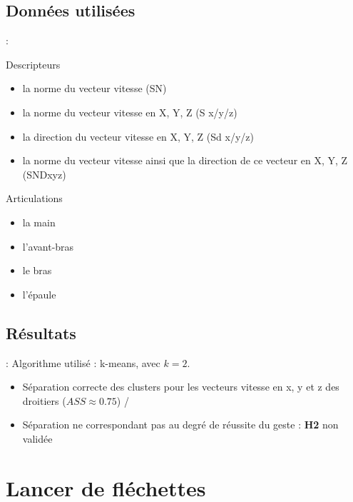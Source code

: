 \documentclass[svgnames]{beamer}
\begin{document}
	\subsection{Données utilisées}	
	\begin{frame}{\secname : \subsecname}
		\begin{block}{Descripteurs}
			\begin{itemize}
				\item la norme du vecteur vitesse (SN)
				\item la norme du vecteur vitesse en X, Y, Z (S x/y/z)
				\item la direction du vecteur vitesse en X, Y, Z (Sd x/y/z)
				\item la norme du vecteur vitesse ainsi que la direction de ce vecteur en X, Y, Z (SNDxyz)
			\end{itemize}
		\end{block}
		
		\begin{block}{Articulations}
			\begin{itemize}
				\item la main
				\item l'avant-bras
				\item le bras
				\item l'épaule
			\end{itemize}
		\end{block}
	\end{frame}
	
	\subsection{Résultats}
	\begin{frame}{\secname : \subsecname}
	Algorithme utilisé : k-means, avec $k=2$.
	\begin{itemize}
		\item Séparation correcte des clusters pour les vecteurs vitesse en x, y et z des droitiers ($ASS \approx 0.75$) /
		\item Séparation ne correspondant pas au degré de réussite du geste : \textbf{H2} non validée
	\end{itemize}
		
	\end{frame}

	\section{Lancer de fléchettes}
\end{document}

